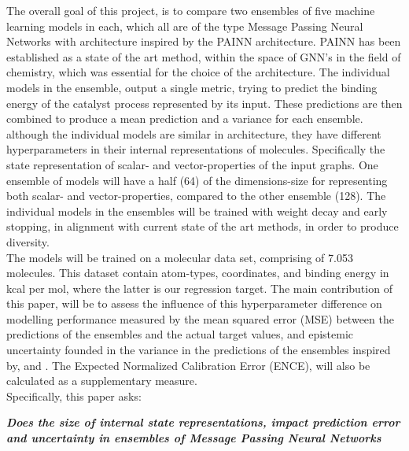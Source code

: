 The overall goal of this project, is to compare two ensembles of five machine learning models in each,
which all are of the type Message Passing Neural Networks with architecture inspired by the
PAINN architecture\cite{PAINN}. PAINN has been established as a state of the art method, within the space of GNN's in the field of chemistry,
which was essential for the choice of the architecture. The individual models in the ensemble, output a single metric,
trying to predict the binding energy of the catalyst process represented by its input.
These predictions are then combined to produce a mean prediction and a variance for each ensemble.
although the individual models are similar in architecture, they have different hyperparameters in their internal representations
of molecules. Specifically the state representation of scalar- and vector-properties of the input graphs.
One ensemble of models will have a half (64)
of the dimensions-size for representing both scalar- and vector-properties, compared to the other ensemble (128).
The individual models in the ensembles will be trained with weight decay and early stopping,
in alignment with current state of the art methods, in order to produce diversity. \\

The models will be trained
on a molecular data set\cite{Meyer2018}, comprising of 7.053 molecules. This dataset contain atom-types, coordinates, and binding
energy in kcal per mol, where the latter is our regression target.
The main contribution of this paper,
will be to assess the influence of this hyperparameter difference on modelling performance measured by the mean squared
error (MSE)
between the predictions of the ensembles and the actual target values,
and epistemic uncertainty founded in the variance in the predictions of the ensembles inspired by\cite{Lakshminarayanan2016},
and \cite{Tran2019}. The Expected Normalized Calibration Error (ENCE), will also be calculated as a supplementary measure.\\

Specifically, this paper asks:

\begin{center}
  \textbf{\textit{Does the size of internal state representations, impact prediction error and uncertainty in ensembles of
      Message Passing Neural Networks}}
\end{center}

